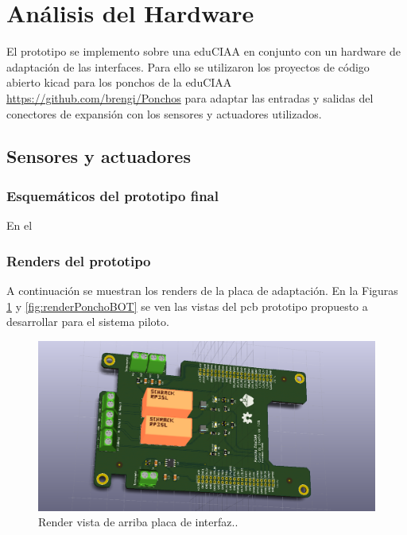 \section{Análisis del Hardware}

El prototipo se implemento sobre una eduCIAA en conjunto con un hardware de adaptación de las interfaces. Para ello se utilizaron los proyectos de código abierto kicad para los ponchos de la eduCIAA \url{https://github.com/brengi/Ponchos} para adaptar las entradas y salidas del conectores de expansión con los sensores y actuadores utilizados. 

\subsection{Sensores y actuadores}

\subsubsection{Esquemáticos del prototipo final}

En el 

\subsubsection{Renders del prototipo}

A continuación se muestran los renders de la placa de adaptación. En la Figuras \ref{fig:renderPonchoTOP} y \ref{fig:renderPonchoBOT} se ven las vistas del pcb prototipo propuesto a desarrollar para el sistema piloto. 

\begin{figure}[h!]
	\centering
	\includegraphics[width=.9\textwidth]{Figures/tempRelayPoncho_TOP}
	\caption{Render vista de arriba placa de interfaz.\protect\footnotemark.}
	\label{fig:renderPonchoTOP}
\end{figure}

